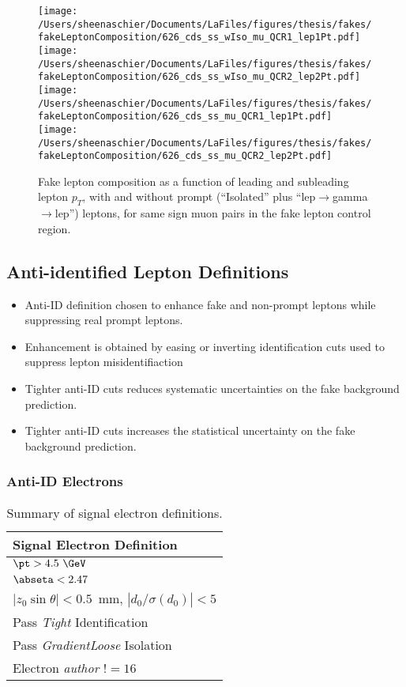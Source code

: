 \begin{figure}[htb]
        \centering
        \texttt{[image: /Users/sheenaschier/Documents/LaFiles/figures/thesis/fakes/fakeLeptonComposition/626\_cds\_ss\_wIso\_mu\_QCR1\_lep1Pt.pdf]}
        \texttt{[image: /Users/sheenaschier/Documents/LaFiles/figures/thesis/fakes/fakeLeptonComposition/626\_cds\_ss\_wIso\_mu\_QCR2\_lep2Pt.pdf]}
        \texttt{[image: /Users/sheenaschier/Documents/LaFiles/figures/thesis/fakes/fakeLeptonComposition/626\_cds\_ss\_mu\_QCR1\_lep1Pt.pdf]}
        \texttt{[image: /Users/sheenaschier/Documents/LaFiles/figures/thesis/fakes/fakeLeptonComposition/626\_cds\_ss\_mu\_QCR2\_lep2Pt.pdf]}
        \caption{Fake lepton composition as a function of leading and subleading lepton $p_{T}$, with and without prompt (``Isolated'' plus ``lep$\to$gamma$\to$lep'') leptons, for same sign muon pairs in the fake lepton control region.}
        \label{fig:muSSCR}
\end{figure}
 \FloatBarrier
 


 \subsection{Anti-identified Lepton Definitions}
 \begin{itemize}
 \item Anti-ID definition chosen to enhance fake and non-prompt leptons while suppressing real prompt leptons.
 \item Enhancement is obtained by easing or inverting identification cuts used to suppress lepton misidentifiaction
 \item Tighter anti-ID cuts reduces systematic uncertainties on the fake background prediction.
 \item Tighter anti-ID cuts increases the statistical uncertainty on the fake background prediction.
 \end{itemize}


\subsubsection{Anti-ID Electrons}

\begin{table}[!htb]
\begin{center}
\begin{tabular}{l}
\hline
Signal Electron Definition  \\
\hline \hline
$\pt > 4.5~\GeV$      \\
$\abseta < 2.47$      \\
$|z_0\sin\theta| < 0.5$~mm,  $|d_0/\sigma(d_0)| < 5$    \\
Pass \textit{Tight} Identification     \\
Pass \textit{GradientLoose} Isolation    \\
Electron \textit{author} $!= 16$ \\
\hline
\end{tabular}
\caption{Summary of signal electron definitions.}
\label{tab:IDLepDefs}
\end{center}
\end{table}

